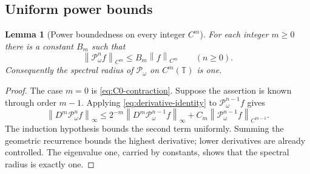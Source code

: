 \documentclass[11pt,a4paper]{article}
\newtheorem{lemma}[theorem]{Lemma}
\theoremstyle{definition}
\theoremstyle{remark}
\newcommand{\T}{\mathbb T}
\newcommand{\norm}[1]{\left\lVert #1\right\rVert}
\newcommand{\Pop}{\mathcal P}
\begin{document}
\subsection{Uniform power bounds}
\begin{lemma}[Power boundedness on every integer $C^m$]
\label{lem:power-bounded}
For each integer $m\ge0$ there is a constant $B_m$ such that
\begin{equation}
 \norm{\Pop_\omega^n f}_{C^m}\le B_m\norm f_{C^m}
 \qquad(n\ge0).
 \label{eq:power-bounded}
\end{equation}
Consequently the spectral radius of $\Pop_\omega$ on $C^m(\T)$ is one.
\end{lemma}
\begin{proof}
The case $m=0$ is \eqref{eq:C0-contraction}.  Suppose the assertion is known
through order $m-1$.  Applying \eqref{eq:derivative-identity} to
$\Pop_\omega^{n-1}f$ gives
\[
 \norm{D^m\Pop_\omega^n f}_\infty
 \le2^{-m}\norm{D^m\Pop_\omega^{n-1}f}_\infty
 +C_m\norm{\Pop_\omega^{n-1}f}_{C^{m-1}}.
\]
The induction hypothesis bounds the second term uniformly.  Summing the
geometric recurrence bounds the highest derivative; lower derivatives are
already controlled.  The eigenvalue one, carried by constants, shows that
the spectral radius is exactly one.
\end{proof}
\end{document}
